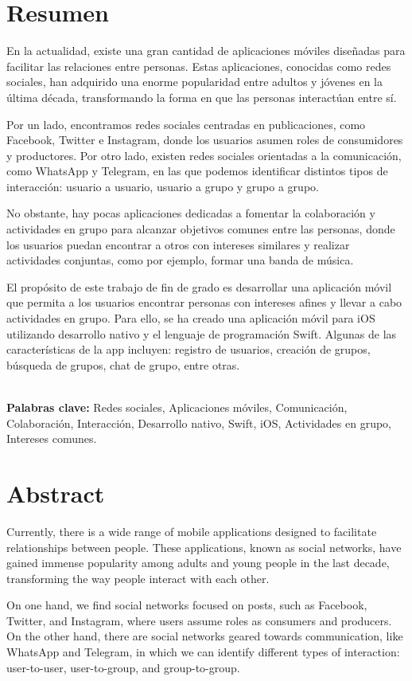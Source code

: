 \documentclass{book}
\begin{document}
\begingroup
\chapter{Resumen}
En la actualidad, existe una gran cantidad de aplicaciones 
móviles diseñadas para facilitar las relaciones entre personas. 
Estas aplicaciones, conocidas como redes sociales, han adquirido 
una enorme popularidad entre adultos y jóvenes en la última década, 
transformando la forma en que las personas interactúan entre sí.

Por un lado, encontramos redes sociales centradas en publicaciones, 
como Facebook, Twitter e Instagram, donde los usuarios asumen roles 
de consumidores y productores. Por otro lado, existen redes sociales 
orientadas a la comunicación, como WhatsApp y Telegram, en las que 
podemos identificar distintos tipos de interacción: usuario a usuario, 
usuario a grupo y grupo a grupo.

No obstante, hay pocas aplicaciones dedicadas a fomentar la colaboración 
y actividades en grupo para alcanzar objetivos comunes entre las personas, 
donde los usuarios puedan encontrar a otros con intereses similares y 
realizar actividades conjuntas, como por ejemplo, formar una banda de música.

El propósito de este trabajo de fin de grado es desarrollar una 
aplicación móvil que permita a los usuarios encontrar personas con 
intereses afines y llevar a cabo actividades en grupo. Para ello, 
se ha creado una aplicación móvil para iOS utilizando desarrollo 
nativo y el lenguaje de programación Swift. Algunas de las características 
de la app incluyen: registro de usuarios, creación de grupos, búsqueda de 
grupos, chat de grupo, entre otras.

\textbf{\\\large Palabras clave: } Redes sociales, Aplicaciones móviles, Comunicación, Colaboración, Interacción, Desarrollo nativo, Swift, iOS, Actividades en grupo, Intereses comunes.

\chapter{Abstract}
Currently, there is a wide range of mobile applications designed to facilitate 
relationships between people. These applications, known as social networks, 
have gained immense popularity among adults and young people in the last decade, 
transforming the way people interact with each other.

On one hand, we find social networks focused on posts, such as Facebook, 
Twitter, and Instagram, where users assume roles as consumers and producers. 
On the other hand, there are social networks geared towards communication, 
like WhatsApp and Telegram, in which we can identify different types of 
interaction: user-to-user, user-to-group, and group-to-group.
\end{document}
